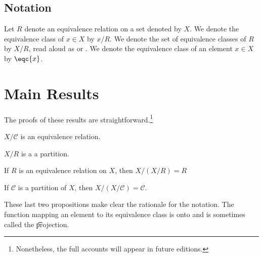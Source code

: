 \subsection*{Notation}

Let $R$ denote an equivalence relation on a set denoted by $X$.
We denote the equivalence class of $x \in X$ by $x / R$.
We denote the set of equivalence classes of $R$ by $X/R$, read aloud as  or .
We denote the equivalence class of an element $x \in X$ by $\eqc{x}$.

\section*{Main Results}

The proofs of these results are straightforward.\footnote{Nonetheless, the full accounts will appear in future editions.}

\begin{proposition}
$X/\mathcal{C} $ is an equivalence relation.\end{proposition}
\begin{proposition}
$X/R$ is a a partition.\end{proposition}
\begin{proposition}
If $R$ is an equivalence relation on $X$, then $X/(X/R) = R$\end{proposition}
\begin{proposition}
If $\mathcal{C} $ is a partition of $X$, then $X/(X/\mathcal{C} ) = \mathcal{C} $.\end{proposition}
These last two propositions make clear the rationale for the notation.
The function mapping an element to its equivalence class is onto and is sometimes called the \t{projection}.
%  

